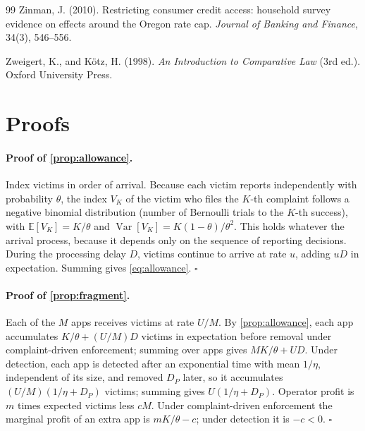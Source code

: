 \documentclass[11pt]{article}
\theoremstyle{plain}
\theoremstyle{definition}
\theoremstyle{remark}
\newcommand{\E}{\mathbb{E}}
\newcommand{\Var}{\operatorname{Var}}
\begin{document}
\begin{thebibliography}{99}
Zinman, J. (2010). Restricting consumer credit access: household survey evidence on effects around the Oregon rate cap. \emph{Journal of Banking and Finance}, 34(3), 546--556.

Zweigert, K., and K{\"o}tz, H. (1998). \emph{An Introduction to Comparative Law} (3rd ed.). Oxford University Press.

\end{thebibliography}

\appendix
\section{Proofs}\label{app:proofs}

\paragraph{Proof of \cref{prop:allowance}.} Index victims in order of arrival. Because each victim reports independently with probability $\theta$, the index $V_K$ of the victim who files the $K$-th complaint follows a negative binomial distribution (number of Bernoulli trials to the $K$-th success), with $\E[V_K] = K/\theta$ and $\Var[V_K] = K(1-\theta)/\theta^2$. This holds whatever the arrival process, because it depends only on the sequence of reporting decisions. During the processing delay $D$, victims continue to arrive at rate $u$, adding $uD$ in expectation. Summing gives \eqref{eq:allowance}. \hfill$\square$

\paragraph{Proof of \cref{prop:fragment}.} Each of the $M$ apps receives victims at rate $U/M$. By \cref{prop:allowance}, each app accumulates $K/\theta + (U/M)D$ victims in expectation before removal under complaint-driven enforcement; summing over apps gives $MK/\theta + UD$. Under detection, each app is detected after an exponential time with mean $1/\eta$, independent of its size, and removed $D_P$ later, so it accumulates $(U/M)(1/\eta + D_P)$ victims; summing gives $U(1/\eta + D_P)$. Operator profit is $m$ times expected victims less $cM$. Under complaint-driven enforcement the marginal profit of an extra app is $mK/\theta - c$; under detection it is $-c<0$. \hfill$\square$
\end{document}
